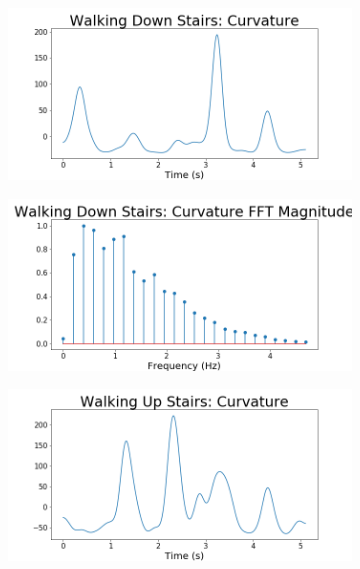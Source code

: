 \begin{figure}[ht]
\begin{subfigure}{.5\textwidth}
  \includegraphics[width = \textwidth]{images/smooth/Walking Down Stairs curvature_ma.png}
    \caption{}
    \label{fig:walkdown_scurv}
\end{subfigure}
\begin{subfigure}{.5\textwidth}
    \includegraphics[width = \textwidth]{images/smooth/Walking Down Stairs curvatureFFT_ma.png}
    \caption{}
    \label{fig:walkdown_scur_fft}
\end{subfigure}
\begin{subfigure}{.5\textwidth}
  \includegraphics[width = \textwidth]{images/smooth/Walking Up Stairs curvature_ma.png}

\end{subfigure}
\end{figure}
